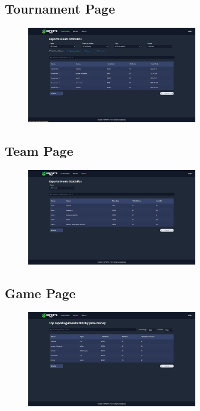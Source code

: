 \clearpage

\subsection{Tournament Page}
\begin{figure}[h]
    \centering
    \includegraphics[width=0.67\textwidth]{Chapter 3/UI/tournament-page}
    \label{fig:Tournament Page}
\end{figure}

\subsection{Team Page}
\begin{figure}[h]
    \centering
    \includegraphics[width=0.67\textwidth]{Chapter 3/UI/teams-page}
    \label{fig:Team Page}
\end{figure}

\subsection{Game Page}
\begin{figure}[h]
    \centering
    \includegraphics[width=0.67\textwidth]{Chapter 3/UI/game-page}
    \label{fig:Game Page}
\end{figure}